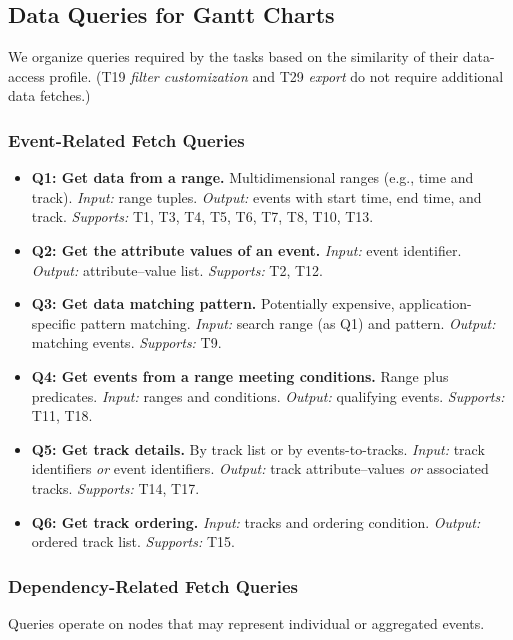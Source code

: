 \begin{refsection}
\subsection{Data Queries for Gantt Charts}
\label{subsec:task_queries}
We organize queries required by the tasks based on the similarity of their data-access profile. (T19 \emph{filter customization} and T29 \emph{export} do not require additional data fetches.)

\subsubsection{Event-Related Fetch Queries}

\begin{itemize}\itemsep0.25ex
\item \textbf{Q1: Get data from a range.} Multidimensional ranges (e.g., time and track). \emph{Input:} range tuples. \emph{Output:} events with start time, end time, and track. \emph{Supports:} T1, T3, T4, T5, T6, T7, T8, T10, T13.

\item \textbf{Q2: Get the attribute values of an event.} \emph{Input:} event identifier. \emph{Output:} attribute--value list. \emph{Supports:} T2, T12.

\item \textbf{Q3: Get data matching pattern.} Potentially expensive, application-specific pattern matching. \emph{Input:} search range (as Q1) and pattern. \emph{Output:} matching events. \emph{Supports:} T9.

\item \textbf{Q4: Get events from a range meeting conditions.} Range plus predicates. \emph{Input:} ranges and conditions. \emph{Output:} qualifying events. \emph{Supports:} T11, T18. 

\item \textbf{Q5: Get track details.} By track list or by events-to-tracks. \emph{Input:} track identifiers \emph{or} event identifiers. \emph{Output:} track attribute--values \emph{or} associated tracks. \emph{Supports:} T14, T17. 

\item \textbf{Q6: Get track ordering.} \emph{Input:} tracks and ordering condition. \emph{Output:} ordered track list. \emph{Supports:} T15.
\end{itemize}

\subsubsection{Dependency-Related Fetch Queries}
Queries operate on nodes that may represent individual or aggregated events.


\end{refsection}
